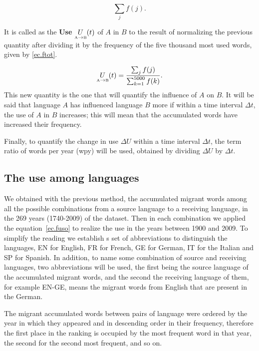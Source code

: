 \documentclass[10pt,letterpaper]{article} %
\begin{document}
\begin{equation}
\label{ec.fpres}
\sum_{j} f(j).
\end{equation}

It is called as the \textbf{Use} $\underset{ \text{\tiny A} \to \text{\tiny B} }{U}(t)$ of $A$ in $B$ to the result of normalizing the previous quantity after dividing it by the frequency of the five thousand most used words, given by \ref{ec.ftot}.

\begin{equation}
\label{ec.fuso}
\underset{ \text{\tiny A} \to  \text{\tiny B} }{U}(t) = \frac{\sum_{j} f(j)}{\sum_{k=1}^{5000} f(k)}.
\end{equation}
This new quantity is the one that will quantify the influence of $A$ on $B$. It will be said that language $A$ has influenced language $B$ more if within a time interval $\Delta t$, the use of $A$ in $B$ increases; this will mean that the accumulated words have increased their frequency.

Finally, to quantify the change in use  $\Delta U$ within a time interval $\Delta t$, the term ratio of words per year (wpy) will be used, obtained by dividing $\Delta U$ by $\Delta t$.
\subsection*{The use among languages} %

We obtained with the previous method, the accumulated migrant words among all the possible combinations from a source language to a receiving language, in the 269 years (1740-2009) of the dataset. Then in each combination we applied the equation~\ref{ec.fuso} to realize the use ​​in the years between 1900 and 2009. To simplify the reading we establish s set of abbreviations to distinguish the languages, EN for English, FR for French, GE for German, IT for the Italian and SP for Spanish. In addition, to name some combination of source  and receiving languages, two abbreviations will be used, the first being the source language of the accumulated migrant words, and the second the receiving language of them, for example EN-GE, means the migrant words from English that are present in the German.

The migrant accumulated words between pairs of language were ordered by the year in which they appeared and in descending order in their frequency, therefore the first place in the ranking is occupied by the most frequent word in that year, the second for the second most frequent, and so on.
\end{document}
